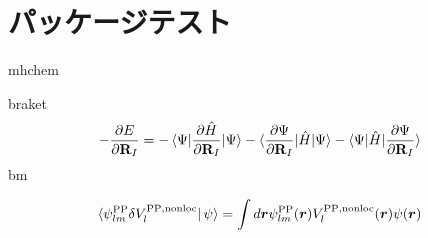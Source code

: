 \section{パッケージテスト}
mhchem

braket
\begin{equation}
    \label{pulay_term}
    - \frac{\partial E}{\partial\textbf{R}_I} =
    - \braket{\Psi | \frac{\partial \hat{H}}{\partial \textbf{R}_I} | \Psi }
    - \braket{\frac{\partial \Psi}{\partial \textbf{R}_I} | \hat{H} | \Psi}
    - \braket{\Psi | \hat{H} | \frac{\partial \Psi}{\partial \textbf{R}_I}}
\end{equation}
bm

\begin{equation}
    \label{eq:pp_shaei}
    \bra{\psi^\mathrm{PP}_{lm}\delta V^{\mathrm{PP,nonloc}}_l}\psi \rangle=\int d \bm{r} \psi^\mathrm{PP}_{lm}(\bm{r}) V^{\mathrm{PP,nonloc}}_l(\bm{r}) \psi(\bm{r})
\end{equation}